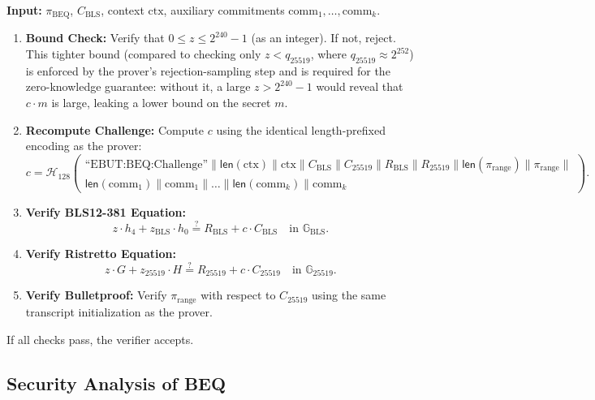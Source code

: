 \documentclass[11pt]{article}
\theoremstyle{definitionstyle}
\theoremstyle{plain}
\begin{document}
\textbf{Input:} $\pi_{\text{BEQ}}$, $C_{\text{BLS}}$, context $\text{ctx}$, auxiliary commitments $\text{comm}_1,\dots,\text{comm}_k$.

\begin{enumerate}[leftmargin=*]
\item \textbf{Bound Check:}
  Verify that $0 \le z \le 2^{240}-1$ (as an integer). If not, reject. This tighter bound (compared to checking only $z < q_{25519}$, where $q_{25519} \approx 2^{252}$) is enforced by the prover's rejection-sampling step and is required for the zero-knowledge guarantee: without it, a large $z > 2^{240}-1$ would reveal that $c \cdot m$ is large, leaking a lower bound on the secret $m$.

\item \textbf{Recompute Challenge:}
  Compute $c$ using the identical length-prefixed encoding as the prover:
  \[
  c = \mathcal{H}_{128}\!\left(
  \begin{array}{l}
  \text{``EBUT:BEQ:Challenge''} \parallel
  \mathsf{len}(\text{ctx}) \parallel \text{ctx} \parallel
  C_{\text{BLS}} \parallel C_{25519} \parallel
  R_{\text{BLS}} \parallel R_{25519} \parallel
  \mathsf{len}(\pi_{\text{range}}) \parallel \pi_{\text{range}} \parallel \\
  \mathsf{len}(\text{comm}_1) \parallel \text{comm}_1 \parallel \dots \parallel
  \mathsf{len}(\text{comm}_k) \parallel \text{comm}_k
  \end{array}
  \right).
  \]

\item \textbf{Verify BLS12-381 Equation:}
  \[
  z \cdot h_4 + z_{\text{BLS}} \cdot h_0 \stackrel{?}{=} R_{\text{BLS}} + c \cdot C_{\text{BLS}} \quad \text{in } \mathbb{G}_{\text{BLS}}.
  \]

\item \textbf{Verify Ristretto Equation:}
  \[
  z \cdot G + z_{25519} \cdot H \stackrel{?}{=} R_{25519} + c \cdot C_{25519} \quad \text{in } \mathbb{G}_{25519}.
  \]

\item \textbf{Verify Bulletproof:}
  Verify $\pi_{\text{range}}$ with respect to $C_{25519}$ using the same transcript initialization as the prover.
\end{enumerate}

If all checks pass, the verifier accepts.

\subsection{Security Analysis of BEQ}
\end{document}
